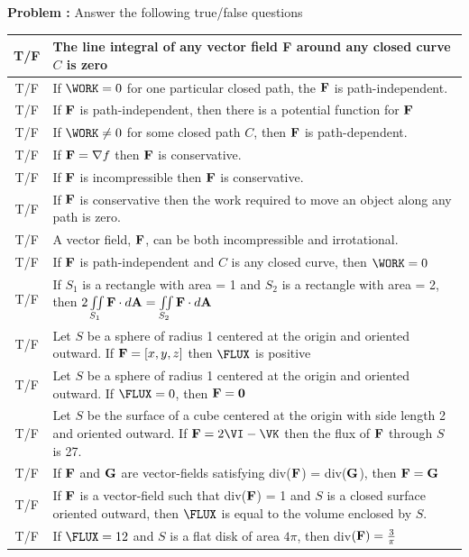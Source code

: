 {\bf Problem :} Answer the following true/false questions

\vspace{0.1cm}

	\setlength{\extrarowheight}{0.2cm}
	\begin{tabular}{| c | p{17.2cm} |}
		\hline
		T\quad/\quad F & The line integral of any vector field {\bf F} around any closed curve $C$ is zero\\
		\hline
		T\quad/\quad F & If $\WORK = 0$ for one particular closed path, the ${\bf F}$ is path-independent.\\
		\hline
		T\quad/\quad F & If ${\bf F}$ is path-independent, then there is a potential function for ${\bf F}$\\
		\hline
		T\quad/\quad F & If $\WORK \ne 0$ for some closed path $C$, then ${\bf F}$ is path-dependent.\\
		\hline
		T\quad/\quad F & If ${\bf F} = \nabla f$ then ${\bf F}$ is conservative.\\
		\hline
		T\quad/\quad F & If ${\bf F}$ is incompressible then ${\bf F}$ is conservative.\\
		\hline
		T\quad/\quad F & If ${\bf F}$ is conservative then the work required to move an object along any path is zero.\\
		\hline
		T\quad/\quad F & A vector field, ${\bf F}$, can be both incompressible and irrotational.\\
		\hline
		T\quad/\quad F & If ${\bf F}$ is path-independent and $C$ is any closed curve, then $\WORK = 0$\\
		\hline
		T\quad/\quad F & If $S_1$ is a rectangle with area = 1 and $S_2$ is a rectangle with area = 2, then
$2\iint \limits_{S_1} {\bf F} \cdot d{\bf A} = \iint \limits_{S_2} {\bf F} \cdot d{\bf A}$\\
		\hline
		T\quad/\quad F & Let $S$ be a sphere of radius 1 centered at the origin and oriented outward.  If ${\bf F} = [x,y,z]$ then $\FLUX$ is positive\\
		\hline
		T\quad/\quad F & Let $S$ be a sphere of radius 1 centered at the origin and oriented outward.  If $\FLUX = 0$, then ${\bf F} = {\bf 0}$\\
		\hline
		T\quad/\quad F & Let $S$ be the surface of a cube centered at the origin with side length 2 and oriented outward.  If ${\bf F} = 2\VI - \VK$ then the flux of ${\bf F}$ through $S$ is 27.\\
		\hline
		T\quad/\quad F & If ${\bf F}$ and ${\bf G}$ are vector-fields satisfying div(${\bf F}$) = div(${\bf G}$), then ${\bf F} = {\bf G}$\\
		\hline
		T\quad/\quad F & If ${\bf F}$ is a vector-field such that div(${\bf F}$) = 1 and $S$ is a closed surface oriented outward, then $\FLUX$ is equal to the volume enclosed by $S$.\\
		\hline
		T\quad/\quad F & If $\FLUX = 12$ and $S$ is a flat disk of area $4\pi$, then div$({\bf F}) = \frac{3}{\pi}$\\
		\hline
	\end{tabular}
